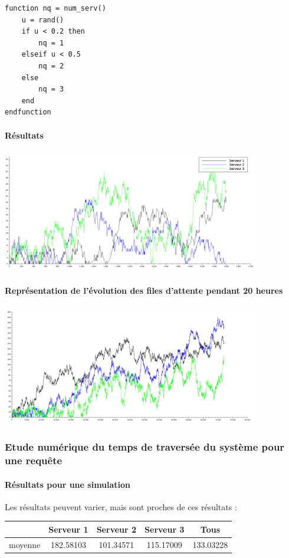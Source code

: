 \documentclass{article}
\begin{document}
\begin{verbatim}
function nq = num_serv()
    u = rand()
    if u < 0.2 then
        nq = 1
    elseif u < 0.5
        nq = 2
    else
        nq = 3
    end
endfunction
\end{verbatim}

\paragraph{Résultats}
\begin{center}
	\includegraphics[width=425px]{img/aleaProp.png}
\end{center}

\paragraph{Représentation de l'évolution des files d'attente pendant 20 heures}
\begin{center}
	\includegraphics[width=425px]{img/alea20h.png}
\end{center}

\subsubsection{Etude numérique du temps de traversée du système pour une requête}

\paragraph{Résultats pour une simulation}
Les résultats peuvent varier, mais sont proches de ces résultats :
\begin{center}
	\begin{tabular}{c|ccc|c}
		\hline \hline
		& Serveur 1 & Serveur 2 & Serveur 3 & Tous \\
		\hline
		moyenne & 182.58103 & 101.34571 & 115.17009 & 133.03228 \\
		\hline \hline
	\end{tabular}
\end{center}
\end{document}
